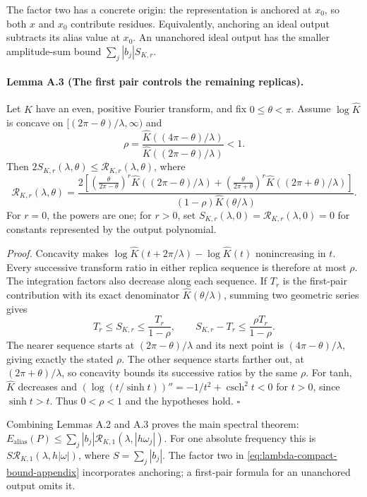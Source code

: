 \documentclass[11pt]{article}
\begin{document}
The factor two has a concrete origin: the representation is anchored
at $x_0$, so both $x$ and $x_0$ contribute residues. Equivalently, anchoring
an ideal output subtracts its alias value at $x_0$. An unanchored ideal
output has the smaller amplitude-sum bound $\sum_j|b_j|S_{K,r}$.

\paragraph{Lemma A.3 (The first pair controls the remaining replicas).}
Let $K$ have an even, positive Fourier transform, and fix $0\le\theta<\pi$.
Assume $\log \widehat K$ is concave on $[(2\pi-\theta)/\lambda,\infty)$ and
\begin{equation}
 \rho=\frac{\widehat K((4\pi-\theta)/\lambda)}{\widehat K((2\pi-\theta)/\lambda)}<1.
 \label{eq:lambda-tail-ratio}
\end{equation}
Then $2S_{K,r}(\lambda,\theta)\le\mathcal R_{K,r}(\lambda,\theta)$, where
\begin{equation}
 \mathcal R_{K,r}(\lambda,\theta)=
 \frac{2\left[
  \left(\frac{\theta}{2\pi-\theta}\right)^r\widehat K((2\pi-\theta)/\lambda)
  +\left(\frac{\theta}{2\pi+\theta}\right)^r\widehat K((2\pi+\theta)/\lambda)
 \right]}
 {(1-\rho)\widehat K(\theta/\lambda)}.
 \label{eq:lambda-compact-bound-appendix}
\end{equation}
For $r=0$, the powers are one; for $r>0$, set
$S_{K,r}(\lambda,0)=\mathcal R_{K,r}(\lambda,0)=0$ for constants
represented by the output polynomial.

\emph{Proof.}
Concavity makes
$\log \widehat K(t+2\pi/\lambda)-\log \widehat K(t)$ nonincreasing in $t$.
Every successive transform ratio in either replica sequence is therefore
at most $\rho$. The integration factors also decrease along each
sequence. If $T_r$ is the first-pair contribution with its exact
denominator $\widehat K(\theta/\lambda)$, summing two geometric series gives
\[
 T_r\le S_{K,r}\le\frac{T_r}{1-\rho},\qquad
 S_{K,r}-T_r\le\frac{\rho T_r}{1-\rho}.
\]
The nearer sequence starts at $(2\pi-\theta)/\lambda$ and its next
point is $(4\pi-\theta)/\lambda$, giving exactly the stated $\rho$.
The other sequence starts farther out, at $(2\pi+\theta)/\lambda$,
so concavity bounds its successive ratios by the same $\rho$.
For tanh, $\widehat K$ decreases and
$(\log(t/\sinh t))''=-1/t^2+\operatorname{csch}^2t<0$ for $t>0$,
since $\sinh t>t$. Thus $0<\rho<1$ and the hypotheses hold.
\hfill$\square$

Combining Lemmas A.2 and A.3 proves the main spectral theorem:
$E_{\mathrm{alias}}(P)\le\sum_j|b_j|
\mathcal R_{K,1}(\lambda,|h\omega_j|)$.
For one absolute frequency this is
$S\mathcal R_{K,1}(\lambda,h|\omega|)$, where
$S=\sum_j|b_j|$. The factor two in
\eqref{eq:lambda-compact-bound-appendix} incorporates anchoring; a
first-pair formula for an unanchored output omits it.
\end{document}
